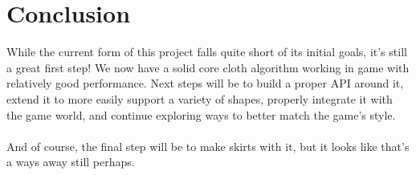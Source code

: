 \documentclass[12pt]{article}
\begin{document}
\section{Conclusion}

While the current form of this project falls quite short of its initial goals, it's still a great first step! We now have a solid core cloth algorithm working in game with relatively good performance. Next steps will be to build a proper API around it, extend it to more easily support a variety of shapes, properly integrate it with the game world, and continue exploring ways to better match the game's style.\\
\\
And of course, the final step will be to make skirts with it, but it looks like that's a ways away still perhaps.



\end{document}
